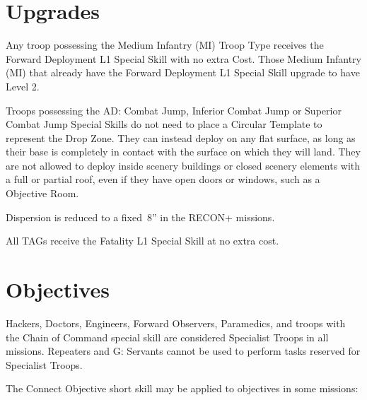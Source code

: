 \section{Upgrades}

  Any troop possessing the Medium Infantry (MI)
Troop Type receives the Forward Deployment L1 Special Skill with no
extra Cost.  Those Medium Infantry (MI) that already have the Forward
Deployment L1 Special Skill upgrade to have Level 2.

  Troops possessing the AD: Combat
Jump, Inferior Combat Jump or Superior Combat Jump Special Skills do
not need to place a Circular Template to represent the Drop Zone.
They can instead deploy on any flat surface, as long as their base is
completely in contact with the surface on which they will land.  They
are not allowed to deploy inside scenery buildings or closed scenery
elements with a full or partial roof, even if they have open doors or
windows, such as a Objective Room.

Dispersion is reduced to a fixed~8'' in the RECON+ missions.

  All TAGs receive the Fatality L1 Special
Skill at no extra cost.

\section{Objectives}

  Hackers, Doctors, Engineers, Forward
Observers, Paramedics, and troops with the Chain of Command special
skill are considered Specialist Troops in all missions.  Repeaters and
G: Servants cannot be used to perform tasks reserved for Specialist
Troops.

 The Connect Objective short skill may
be applied to objectives in some missions:

